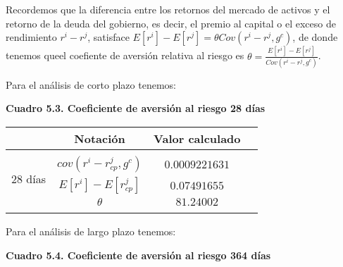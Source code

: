 \documentclass[
]{article}
\begin{document}
Recordemos que la diferencia entre los retornos del mercado de activos y
el retorno de la deuda del gobierno, es decir, el premio al capital o el
exceso de rendimiento \(r^i-r^j\), satisface
\(E[r^i]-E[r^j]=\theta Cov(r^i-r^j, g^c)\), de donde tenemos queel
coefiente de aversión relativa al riesgo es
\(\theta =\frac{E[r^i]-E[r^j]}{Cov(r^i-r^j, g^c)}\).

Para el análisis de corto plazo tenemos:

\begin{center}
\textbf{Cuadro 5.3. Coeficiente de aversión al riesgo 28 días}
\end{center}
\begin{table}[h!]
                \begin{center} 
                    \begin{tabular}{|c|c|c|c|} 
                        \hline 
                        \mbox{}\;\;\;\;\;\mbox{}& \; Notación\;  & \; Valor calculado\; \\ 
                        \hline 
                        \multirow{4}{*}{\begin{sideways}28 días\end{sideways}}  
                            &   &  \\
                        &$cov(r^i-r_{cp}^j, g^c)$  & $0.0009221631$ \\
                        &$E[r^i]-E[r^j_{cp}]$ & $0.07491655$ \\ 
                        &$\theta$ & $81.24002$ \\ 
                        &  &   \\
                        \hline \hline
                        \hline
                    \end{tabular}
                \end{center}
\end{table}

Para el análisis de largo plazo tenemos:

\begin{center}
\textbf{Cuadro 5.4. Coeficiente de aversión al riesgo 364 días}
\end{center}
\end{document}
